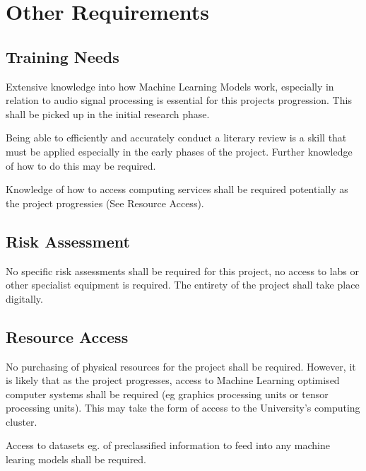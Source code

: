 \chapter{Other Requirements}

\label{ch:other}

\section{Training Needs}

Extensive knowledge into how Machine Learning Models work, especially in relation
to audio signal processing is essential for this projects progression. This shall
be picked up in the initial research phase.

Being able to efficiently and accurately conduct a literary review is a skill that
must be applied especially in the early phases of the project. Further knowledge
of how to do this may be required.

Knowledge of how to access computing services shall be required potentially as the
project progressies (See Resource Access).

\section{Risk Assessment}

No specific risk assessments shall be required for this project, no access to labs
or other specialist equipment is required. The entirety of the project shall take
place digitally.

\section{Resource Access}

No purchasing of physical resources for the project shall be required. However,
it is likely that as the project progresses, access to Machine Learning optimised
computer systems shall be required (eg graphics processing units or tensor processing
units). This may take the form of access to the University's computing cluster.

Access to datasets eg. of preclassified information to feed into any machine learing
models shall be required.